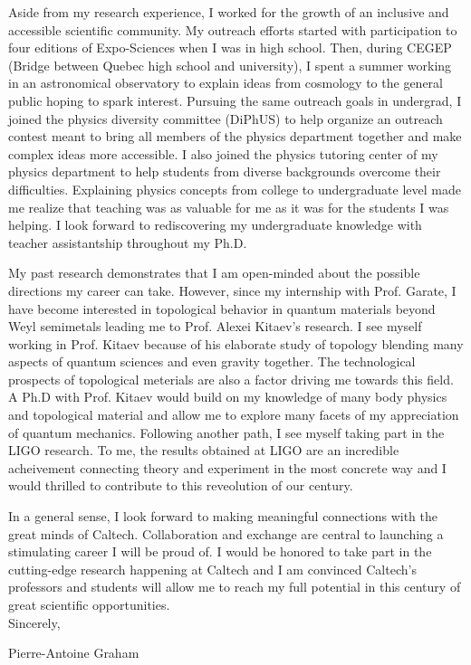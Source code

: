 \documentclass[12pt]{article}
\begin{document}
Aside from my research experience, I worked for the growth of an inclusive and accessible scientific community. My outreach efforts started with participation to four editions of Expo-Sciences when I was in high school. Then, during CEGEP (Bridge between Quebec high school and university), I spent a summer working in an astronomical observatory to explain ideas from cosmology to the general public hoping to spark interest. Pursuing the same outreach goals in undergrad, I joined the physics diversity committee (DiPhUS) to help organize an outreach contest meant to bring all members of the physics department together and make complex ideas more accessible. I also joined the physics tutoring center of my physics department to help students from diverse backgrounds overcome their difficulties. Explaining physics concepts from college to undergraduate level made me realize that teaching was as valuable for me as it was for the students I was helping. I look forward to rediscovering my undergraduate knowledge with teacher assistantship throughout my Ph.D.  

\vspace{0.4cm}

My past research demonstrates that I am open-minded about the possible directions my career can take. However, since my internship with Prof. Garate, I have become interested in topological behavior in quantum materials beyond Weyl semimetals leading me to Prof. Alexei Kitaev's research. I see myself working in Prof. Kitaev because of his elaborate study of topology blending many aspects of quantum sciences and even gravity together.  The technological prospects of topological meterials are also a factor driving me towards this field. A Ph.D with Prof. Kitaev would build on my knowledge of many body physics and topological material and allow me to explore many facets of my appreciation of quantum mechanics. Following another path, I see myself taking part in the LIGO research. To me, the results obtained at LIGO are an incredible acheivement connecting theory and experiment in the most concrete way and I would thrilled to contribute to this reveolution of our century.  

\vspace{0.4cm}

In a general sense, I look forward to making meaningful connections with the great minds of Caltech. Collaboration and exchange are central to launching a stimulating career I will be proud of. I would be honored to take part in the cutting-edge research happening at Caltech and I am convinced Caltech's professors and students will allow me to reach my full potential in this century of great scientific opportunities.\\
\vspace{0.4cm}
Sincerely,

\vspace{0.4cm}
Pierre-Antoine Graham
\end{document}
